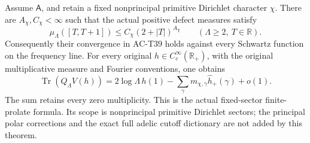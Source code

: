 \begin{theorem}
\label{AC-T41}
Assume \(\mathsf A\), and retain a fixed nonprincipal primitive
Dirichlet character \(\chi\).
There are \(A_\chi,C_\chi<\infty\) such that the actual
positive defect measures satisfy
\[
        \mu_\Lambda([T,T+1])
            \leq C_\chi(2+|T|)^{A_\chi}
                       \qquad(\Lambda\geq2,\ T\in\mathbb R).
 \tag{TT.20}
\]
Consequently their convergence in AC-T39 holds against
every Schwartz function on the frequency line.
For every original \(h\in C_c^\infty(\mathbb R_+)\),
with the original multiplicative measure and Fourier
conventions, one obtains
\[
 \operatorname{Tr}(Q_\Lambda V(h))
       =2\log\Lambda\,h(1)
           -\sum_\gamma m_{\chi,\gamma}\widehat h_+(\gamma)
              +o(1).
 \tag{TT.21}
\]
The sum retains every zero multiplicity.
This is the actual fixed-sector finite-prolate formula.
Its scope is nonprincipal primitive Dirichlet sectors;
the principal polar corrections and the exact full
adelic cutoff dictionary are not added by this theorem.
\end{theorem}
